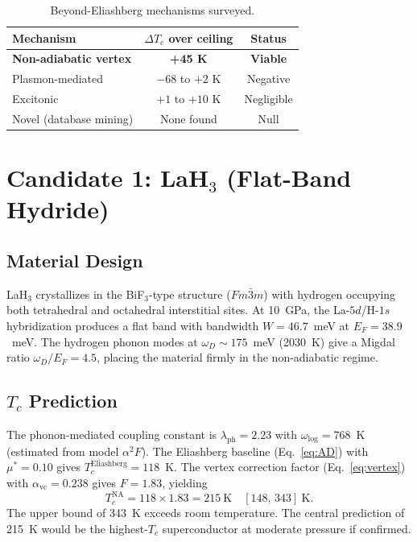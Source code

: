 \documentclass[aps,prb,reprint,superscriptaddress,longbibliography]{revtex4-2}
\begin{document}
\begin{table}[h]
\caption{Beyond-Eliashberg mechanisms surveyed.}
\label{tab:beyond}
\begin{ruledtabular}
\begin{tabular}{lcc}
Mechanism & $\Delta T_c$ over ceiling & Status \\
\hline
\textbf{Non-adiabatic vertex} & \textbf{+45 K} & \textbf{Viable} \\
Plasmon-mediated & $-68$ to $+2$ K & Negative \\
Excitonic & $+1$ to $+10$ K & Negligible \\
Novel (database mining) & None found & Null \\
\end{tabular}
\end{ruledtabular}
\end{table}

\section{Candidate 1: LaH$_3$ (Flat-Band Hydride)}
\label{sec:lah3}

\subsection{Material Design}

LaH$_3$ crystallizes in the BiF$_3$-type structure ($Fm\bar{3}m$) with hydrogen occupying both tetrahedral and octahedral interstitial sites. At 10~GPa, the La-$5d$/H-$1s$ hybridization produces a flat band with bandwidth $W = 46.7$~meV at $E_F = 38.9$~meV. The hydrogen phonon modes at $\omega_D \sim 175$~meV (2030~K) give a Migdal ratio $\omega_D/E_F = 4.5$, placing the material firmly in the non-adiabatic regime.

\subsection{$T_c$ Prediction}

The phonon-mediated coupling constant is $\lambda_{\mathrm{ph}} = 2.23$ with $\omega_{\log} = 768$~K (estimated from model $\alpha^2F$). The Eliashberg baseline (Eq.~\ref{eq:AD}) with $\mu^* = 0.10$ gives $T_c^{\mathrm{Eliashberg}} = 118$~K. The vertex correction factor (Eq.~\ref{eq:vertex}) with $\alpha_{\mathrm{vc}} = 0.238$ gives $F = 1.83$, yielding
\begin{equation}
    T_c^{\mathrm{NA}} = 118 \times 1.83 = 215~\text{K}\quad [148,\, 343]~\text{K}.
    \label{eq:lah3}
\end{equation}
The upper bound of 343~K exceeds room temperature. The central prediction of 215~K would be the highest-$T_c$ superconductor at moderate pressure if confirmed.
\end{document}
